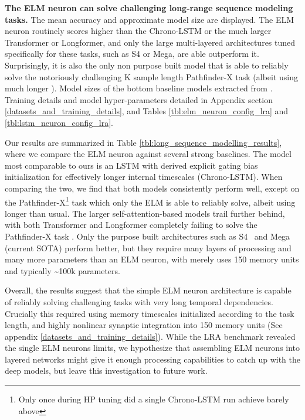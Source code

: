 \documentclass{article} \usepackage{iclr2024_doc_style,times}
\begin{document}
\begin{table}
\begin{minipage}{0.99\linewidth}
\begin{minipage}[c]{0.99\linewidth}
            \textbf{The ELM neuron can solve challenging long-range sequence modeling tasks.} The mean accuracy and approximate model size are displayed. The ELM neuron routinely scores higher than the Chrono-LSTM or the much larger Transformer or Longformer, and only the large multi-layered architectures tuned specifically for these tasks, such as S4 or Mega, are able outperform it. Surprisingly, it is also the only non purpose built model that is able to reliably solve the notoriously challenging K sample length Pathfinder-X task (albeit using much longer ). Model sizes of the bottom baseline models extracted from \cite{guefficiently}\cite{ma2023mega}\cite{tay2021long}. Training details and model hyper-parameters detailed in Appendix section \ref{datasets_and_training_details}, and Tables \ref{tbl:elm_neuron_config_lra} and \ref{tbl:lstm_neuron_config_lra}.
        \end{minipage}
    \end{minipage}
    \vspace{-5pt} \end{table}

Our results are summarized in Table \ref{tbl:long_sequence_modelling_results}, where we compare the ELM neuron against several strong baselines. The model most comparable to ours is an LSTM with derived explicit gating bias initialization for effectively longer internal timescales \cite{tallec2018can} (Chrono-LSTM).
When comparing the two, we find that both models consistently perform well, except on the Pathfinder-X\footnote{Only once during HP tuning did a single Chrono-LSTM run achieve barely above } task which only the ELM is able to reliably solve, albeit using longer  than usual. The larger self-attention-based models trail further behind, with both Transformer \cite{vaswani2017attention} and Longformer \cite{beltagy2020longformer} completely failing to solve the Pathfinder-X task \cite{tay2021long}. Only the purpose built architectures such as S4~\cite{guefficiently} and Mega~\cite{ma2023mega} (current SOTA) perform better, but they require many layers of processing and many more parameters than an ELM neuron, with merely uses 150 memory units and typically \textasciitilde 100k parameters.

Overall, the results suggest that the simple ELM neuron architecture is capable of reliably solving challenging tasks with very long temporal dependencies. Crucially this required using memory timescales initialized according to the task length, and highly nonlinear synaptic integration into 150 memory units (See appendix \ref{datasets_and_training_details}). While the LRA benchmark revealed the single ELM neurons limits, we hypothesize that assembling ELM neurons into layered networks might give it enough processing capabilities to catch up with the deep models, but leave this investigation to future work.
\end{document}
